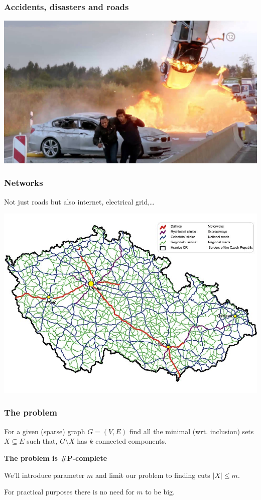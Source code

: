 \documentclass[10pt]{beamer}
\begin{document}
\begin{frame}
	\frametitle{Accidents, disasters and roads}
	\includegraphics[width=\textwidth]{images/kobra_11.jpg}
\end{frame}

\begin{frame}
	\frametitle{Networks}
	Not just roads but also internet, electrical grid,\ldots

	\includegraphics[width=\textwidth]{images/road_network.jpg}
\end{frame}


\begin{frame}[fragile]
	\frametitle{The problem}


	For a given (sparse) graph $G = (V, E)$ find all the minimal (wrt.
	inclusion) sets $X \subseteq E$ such that, $G \setminus X$ has $k$
	connected components. \\

	\bigskip

	\bigskip
	\textbf{The problem is \#P-complete}

	We'll introduce parameter $m$ and limit our problem to finding cuts $\lvert
	X \rvert \leq m$.

    For practical purposes there is no need for $m$ to be big.


\end{frame}
\end{document}
